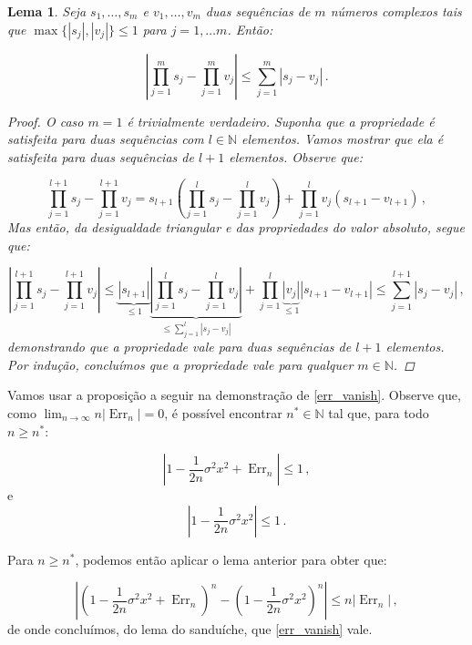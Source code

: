 \documentclass[12pt,a4paper]{article}
\newtheorem{lemma}{Lema}
\begin{document}
\begin{lemma}
Seja $s_1,\ldots, s_m$ e $v_1,\ldots, v_m$ duas sequências de $m$ números complexos tais que $\max\{|s_j|,|v_j|\}\leq 1$ para $j=1,\ldots m $. Então:

$$\left|\prod_{j=1}^m s_j - \prod_{j=1}^m v_j\right|\leq \sum_{j=1}^m |s_j-v_j|\, .$$
\begin{proof}
	O caso $m=1$ é trivialmente verdadeiro. Suponha que a propriedade é satisfeita para duas sequências com $l \in \mathbb{N}$ elementos. Vamos mostrar que ela é satisfeita para duas sequências de $l+1$ elementos. Observe que:
	
	$$\prod_{j=1}^{l+1} s_j - \prod_{j=1}^{l+1} v_j = s_{l+1}\left(\prod_{j=1}^{l} s_j - \prod_{j=1}^{l} v_j\right) + \prod_{j=1}^{l} v_j\left(s_{l+1} - v_{l+1}\right)\, , $$
	Mas então, da desigualdade triangular e das propriedades do valor absoluto, segue que:
	
	$$\left|\prod_{j=1}^{l+1} s_j - \prod_{j=1}^{l+1} v_j\right|\leq \underbrace{|s_{l+1}|}_{\leq 1}\underbrace{\left|\prod_{j=1}^{l} s_j - \prod_{j=1}^{l} v_j \right|}_{\leq \sum_{j=1}^{l}|s_j-v_j| } + \prod_{j=1}^{l} \underbrace{|v_j|}_{\leq 1}\left|s_{l+1} - v_{l+1}\right| \leq \sum_{j=1}^{l+1}|s_j-v_j|\, ,$$
	demonstrando que a propriedade vale para duas sequências de $l+1$ elementos. Por indução, concluímos que a propriedade vale para qualquer $m \in \mathbb{N}$.
	
\end{proof}
\end{lemma}

Vamos usar a proposição a seguir na demonstração de \eqref{err_vanish}. Observe que, como $\lim_{n \to \infty}n|\operatorname{Err}_n|=0$, é possível encontrar $n^* \in \mathbb{N}$ tal que, para todo $n \geq n^*$:

$$\left|1 - \frac{1}{2n}\sigma^2 x^2 + \operatorname{Err}_n\right| \leq 1\, ,$$
e
$$\left|1 - \frac{1}{2n}\sigma^2 x^2\right|\leq 1\, .$$

Para $n\geq n^*$, podemos então aplicar o lema anterior para obter que:

$$\left|\left(1 - \frac{1}{2n}\sigma^2 x^2 + \operatorname{Err}_n \right)^n - \left(1 - \frac{1}{2n}\sigma^2 x^2\right)^n\right| \leq n |\operatorname{Err}_n|\, ,$$
de onde concluímos, do lema do sanduíche, que \eqref{err_vanish} vale.
\end{document}
